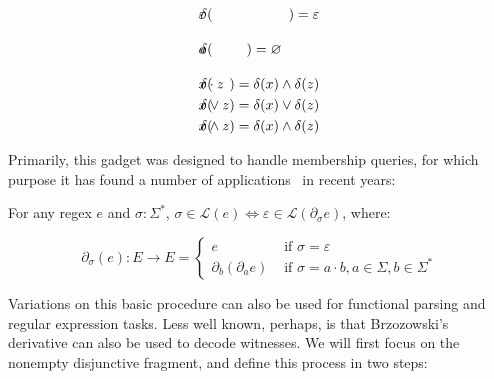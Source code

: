 \documentclass[sigplan,review,acmsmall,nonacm,screen,anonymous]{acmart}\settopmatter{printfolios=false,printccs=false,printacmref=false}
\begin{document}
\begin{definition}[Brzozowski, 1964]
\begin{multicols}{2}
\begin{eqnarray*}
      \delta(&\hspace{-0.35cm} \varepsilon \hspace{-0.35cm}&) = \varepsilon                                      \\
      \delta(&\hspace{-0.35cm} a           \hspace{-0.35cm}&) = \varnothing\phantom{\begin{cases}\varepsilon\\\varnothing\end{cases}}\\
      \delta(&\hspace{-0.35cm} x\cdot z    \hspace{-0.35cm}&) = \delta(x) \land \delta(z)                        \\
      \delta(&\hspace{-0.35cm} x\vee  z    \hspace{-0.35cm}&) = \delta(x) \vee  \delta(z)                        \\
      \delta(&\hspace{-0.35cm} x\land z    \hspace{-0.35cm}&) = \delta(x) \land \delta(z)
    \end{eqnarray*}
  \end{multicols}
\end{definition}

Primarily, this gadget was designed to handle membership queries, for which purpose it has  found a number of applications~\cite{might2011parsing,stanford2021symbolic,varatalu2025re} in recent years:

\begin{theorem}[Recognition]
  For any regex \(e\) and \(\sigma: \Sigma^*\), \(\sigma \in \mathcal{L}(e) \Longleftrightarrow \varepsilon \in \mathcal{L}(\partial_\sigma e)\), where:

  \[
    \partial_\sigma (e): E \rightarrow E = \begin{cases}e &\text{ if } \sigma = \varepsilon\\\partial_b(\partial_a e) &\text{ if } \sigma = a \cdot b, a \in \Sigma, b \in \Sigma^* \end{cases}
  \]
\end{theorem}

Variations on this basic procedure can also be used for functional parsing and regular expression tasks. Less well known, perhaps, is that Brzozowski's derivative can also be used to decode witnesses. We will first focus on the nonempty disjunctive fragment, and define this process in two steps:
\end{document}
